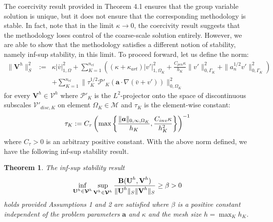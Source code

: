 \documentclass[11pt]{article}
\newtheorem{theorem}{Theorem}[section]
\begin{document}
The coercivity result provided in Theorem 4.1 ensures that the group variable solution is unique, but it does not ensure that the corresponding methodology is stable.  In fact, note that in the limit $\kappa \rightarrow 0$, the coercivity result suggests that the methodology loses control of the coarse-scale solution entirely.  However, we are able to show that the methodology satisfies a different notion of stability, namely inf-sup stability, in this limit.  To proceed forward, let us define the norm:
\begin{eqnarray}
\| \textbf{V}^h \|^2_S &:=& \kappa | \bar{v} |^2_{1,\Omega} + \sum_{K=1}^{n_{el}} \left( \left( \kappa + \kappa_{art} \right) | v' |^2_{1,\Omega_K} + \frac{C_{pen}\kappa}{h_K} \| v' \|^2_{0,\Gamma_K} + \| a_n^{1/2} v' \|^2_{0,\Gamma_K} \right) \nonumber \\ && + \sum_{K=1}^{n_{el}} \| \tau_K^{1/2} \mathcal{P}'_K \left( \bm{a} \cdot \nabla \left(\bar{v} + v'\right) \right) \|^2_{0,\Omega_K}
\end{eqnarray}
for every $\textbf{V}^h \in \bm{\mathcal{V}}^h$ where $\mathcal{P}'_K$ is the $L^2$-projector onto the space of discontinuous subscales $\mathcal{V}'_{disc,K}$ on element $\Omega_K \in \mathcal{M}$ and $\tau_K$ is the element-wise constant:
\begin{equation}
\tau_K := C_{\tau} \left( \textup{max}\left\{ \frac{\| \bm{a} \|_{0,\infty,\Omega_K}}{h_K}, \frac{C_{inv} \kappa}{h^2_K} \right \}\right)^{-1} \nonumber
\end{equation}
where $C_{\tau} > 0$ is an arbitrary positive constant.  With the above norm defined, we have the following inf-sup stability result.

\begin{theorem}
The inf-sup stability result
\begin{equation}
\inf_{\textup{\textbf{U}}^h \in \bm{\mathcal{V}}^h} \sup_{\textup{\textbf{V}}^h \in \bm{\mathcal{V}}^h} \frac{\textup{\textbf{B}}(\textup{\textbf{U}}^h,\textup{\textbf{V}}^h)}{ \| \textup{\textbf{U}}^h \|_S \| \textup{\textbf{V}}^h \|_S } \geq \beta > 0 \nonumber
\end{equation}
holds provided Assumptions 1 and 2 are satisfied where $\beta$ is a positive constant independent of the problem parameters $\bm{a}$ and $\kappa$ and the mesh size $h = \max_{K} h_K$.
\end{theorem}
\end{document}
